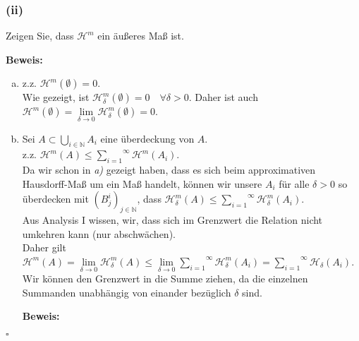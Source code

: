 \subsubsection*{(ii)}

Zeigen Sie, dass $\mathcal{H}^m$ ein äußeres Maß ist.

\textbf{Beweis:}\\

\begin{enumerate}[a)]
    \item z.z. $ \mathcal{H}^m (\emptyset) = 0$.\\
        Wie gezeigt, ist $\mathcal{H}^m_\delta (\emptyset) = 0 \quad \forall \delta > 0$. 
        Daher ist auch $\mathcal{H}^m (\emptyset) = \underset{\delta \rightarrow 0}{\lim} \mathcal{H}^m_\delta (\emptyset) = 0$.
    \item Sei $A \subset \underset{i\in\mathbb{N}}{\bigcup} A_i$ eine überdeckung von $A$.\\
        z.z. $\mathcal{H}^m (A) \leq \overset{\infty}{\underset{i=1}{\sum}} \mathcal{H}^m (A_i)$.\\
        
        Da wir schon in \emph{a)} gezeigt haben, dass es sich beim approximativen Hausdorff-Maß um ein Maß handelt, können wir unsere $A_i$
        für alle $\delta > 0$ so überdecken mit $(B^i_j)_{j \in \mathbb{N}}$, dass 
        $\mathcal{H}^m_\delta (A) \leq \overset{\infty}{\underset{i=1}{\sum}} \mathcal{H}^m_\delta (A_i)$.\\
        
        Aus Analysis I wissen, wir, dass sich im Grenzwert die Relation nicht umkehren kann (nur abschwächen). \\
        Daher gilt
        $\mathcal{H}^m (A) = \underset{\delta \rightarrow 0}{\lim} \mathcal{H}^m_\delta (A) \leq
        \underset{\delta \rightarrow 0}{\lim} \overset{\infty}{\underset{i=1}{\sum}} \mathcal{H}^m_\delta (A_i)
        = \overset{\infty}{\underset{i=1}{\sum}} \mathcal{H}_\delta (A_i)$.\\

        Wir können den Grenzwert in die Summe ziehen, da die einzelnen Summanden unabhängig von einander bezüglich $\delta$ sind.
     

\textbf{Beweis:}\\
\end{enumerate}
\mbox{} \hfill $\square$
